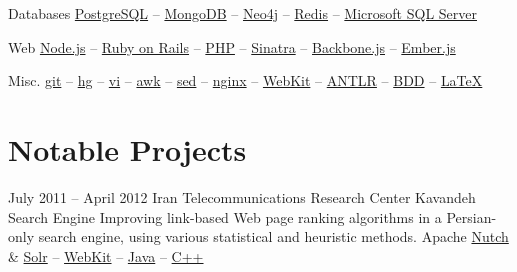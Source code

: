 \documentclass{tccv}
\begin{document}
{{\begin{factlist}
\item{Databases}
     {
     \href{http://www.postgresql.org}{PostgreSQL} -- 
     \href{http://www.mongodb.org}{MongoDB} -- 
     \href{http://www.neo4j.org}{Neo4j} -- 
     \href{http://redis.io}{Redis} -- 
     \href{http://www.microsoft.com/en-us/sqlserver/default.aspx}{Microsoft SQL Server}
     }

\item{Web}
     {
     \href{http://nodejs.org}{Node.js} -- 
     \href{http://rubyonrails.org}{Ruby on Rails} -- 
     \href{http://php.net}{PHP} -- 
     \href{http://www.sinatrarb.com}{Sinatra} -- 
     \href{http://backbonejs.org}{Backbone.js} -- 
     \href{http://emberjs.com}{Ember.js}
     }

\item{Misc.}
     {
     \href{http://git-scm.com}{git} -- 
     \href{http://www.selenic.com/mercurial/}{hg} -- 
     \href{http://www.vim.org}{vi} -- 
     \href{http://awk.info}{awk} -- 
     \href{http://www.gnu.org/software/sed/}{sed} -- 
     \href{http://nginx.org/en/}{nginx} -- 
     \href{http://www.webkit.org}{WebKit} -- 
     \href{http://www.antlr.org}{ANTLR} -- 
     \href{http://en.wikipedia.org/wiki/Behavior-driven_development}{BDD} -- 
     \href{http://www.latex-project.org}{\LaTeX}
     }

\end{factlist}





\newpage


\section{Notable Projects}

\begin{project_list}

\item{July 2011 -- April 2012}
     {Iran Telecommunications Research Center}
     {Kavandeh Search Engine}
	 {Improving link-based Web page ranking algorithms in a Persian-only search engine, using various statistical and heuristic methods.}
     {
     	Apache \href{http://nutch.apache.org}{Nutch} \&
		\href{http://lucene.apache.org/solr/}{Solr} -- 
		\href{http://www.webkit.org}{WebKit} -- 
		\href{http://www.oracle.com/technetwork/java/}{Java} -- 
		\href{https://en.wikipedia.org/wiki/C\%2B\%2B}{C++}
	}

\vspace{-8pt}


\end{project_list}}}
\end{document}
